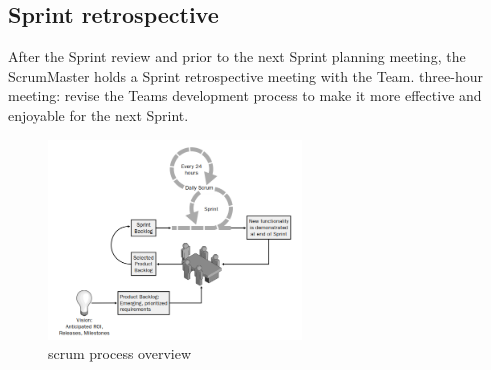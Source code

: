 \subsection*{Sprint retrospective}
After the Sprint review and prior to the next Sprint planning meeting, the ScrumMaster holds a Sprint retrospective meeting with the Team. three-hour meeting: revise the Teams development process to make it more effective and enjoyable for the next Sprint. 

\begin{figure}[H]
  \centering
  \includegraphics[width=0.6\textwidth]{./figures/chapter_1/scrum_process_overview.PNG}
  \caption{scrum process overview}
  \label{fig:ch1-scrum_process_overview}
\end{figure}\bigskip


